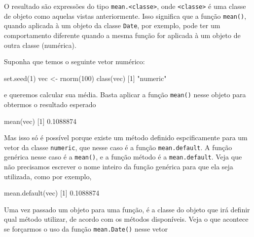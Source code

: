 \documentclass[
  10pt,
  a4paper]{book}
\newenvironment{Shaded}{\begin{snugshade}}{\end{snugshade}}
\newcommand{\DecValTok}[1]{\textcolor[rgb]{0.00,0.00,0.81}{#1}}
\newcommand{\FloatTok}[1]{\textcolor[rgb]{0.00,0.00,0.81}{#1}}
\newcommand{\FunctionTok}[1]{\textcolor[rgb]{0.00,0.00,0.00}{#1}}
\newcommand{\NormalTok}[1]{#1}
\newcommand{\OtherTok}[1]{\textcolor[rgb]{0.56,0.35,0.01}{#1}}
\newcommand{\StringTok}[1]{\textcolor[rgb]{0.31,0.60,0.02}{#1}}
\begin{document}
O resultado são expressões do tipo \texttt{mean.\textless{}classe\textgreater{}}, onde \texttt{\textless{}classe\textgreater{}} é
uma classe de objeto como aquelas vistas anteriormente. Isso significa
que a função \texttt{mean()}, quando aplicada à um objeto da classe \texttt{Date}, por
exemplo, pode ter um comportamento diferente quando a mesma função for
aplicada à um objeto de outra classe (numérica).

Suponha que temos o seguinte vetor numérico:

\begin{Shaded}
\begin{Highlighting}[]
\FunctionTok{set.seed}\NormalTok{(}\DecValTok{1}\NormalTok{)}
\NormalTok{vec }\OtherTok{\textless{}{-}} \FunctionTok{rnorm}\NormalTok{(}\DecValTok{100}\NormalTok{)}
\FunctionTok{class}\NormalTok{(vec)}
\NormalTok{[}\DecValTok{1}\NormalTok{] }\StringTok{"numeric"}
\end{Highlighting}
\end{Shaded}

e queremos calcular sua média. Basta aplicar a função \texttt{mean()} nesse
objeto para obtermos o resultado esperado

\begin{Shaded}
\begin{Highlighting}[]
\FunctionTok{mean}\NormalTok{(vec)}
\NormalTok{[}\DecValTok{1}\NormalTok{] }\FloatTok{0.1088874}
\end{Highlighting}
\end{Shaded}

Mas isso só é possível porque existe um método definido espcificamente
para um vetor da classe \texttt{numeric}, que nesse caso é a função
\texttt{mean.default}. A função genérica nesse caso é a \texttt{mean()}, e a função
método é a \texttt{mean.default}. Veja que não precisamos escrever o nome
inteiro da função genérica para que ela seja utilizada, como por exemplo,

\begin{Shaded}
\begin{Highlighting}[]
\FunctionTok{mean.default}\NormalTok{(vec)}
\NormalTok{[}\DecValTok{1}\NormalTok{] }\FloatTok{0.1088874}
\end{Highlighting}
\end{Shaded}

Uma vez passado um objeto para uma função, é a classe do objeto que irá
definir qual método utilizar, de acordo com os métodos disponíveis. Veja
o que acontece se forçarmos o uso da função \texttt{mean.Date()} nesse vetor
\end{document}
